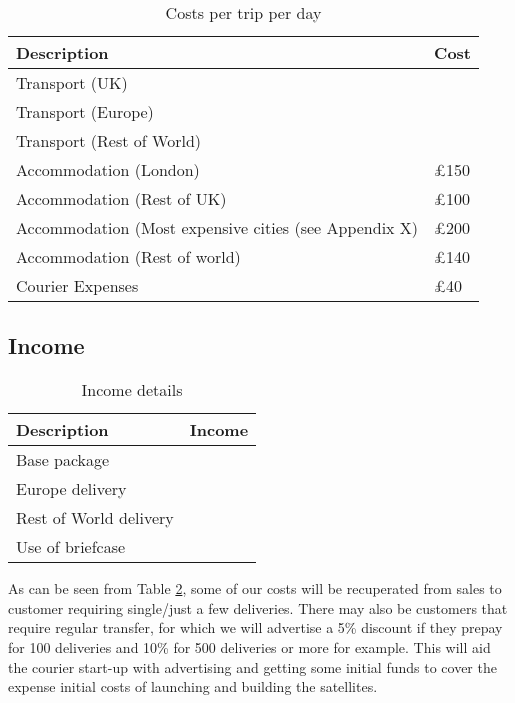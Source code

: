 \begin{table}[H]
    \centering
    \begin{tabular}{|p{}|p{}|}
        \hline
        \textbf{Description} & \textbf{Cost} \\
        \hline
        Transport (UK) & \\
        \hline
        Transport (Europe) & \\
        \hline
        Transport (Rest of World) & \\
        \hline
        Accommodation (London) & £150\\
        \hline
        Accommodation (Rest of UK) & £100\\
        \hline
        Accommodation (Most expensive cities (see Appendix X) & £200\\
        \hline
        Accommodation (Rest of world) & £140\\
        \hline
        Courier Expenses & £40\\
        \hline
    \end{tabular}
    \caption{Costs per trip per day}
    \label{tab:tripCosts}
\end{table}

\subsection{Income}

\begin{table}[H]
    \centering
    \begin{tabular}{|p{}|p{}|}
        \hline
        \textbf{Description} & \textbf{Income} \\
        \hline
        Base package & \\
        \hline
        Europe delivery & \\
        \hline
        Rest of World delivery & \\
        \hline
        Use of briefcase & \\
        \hline
    \end{tabular}
    \caption{Income details}
    \label{tab:customerPricing}
\end{table}

As can be seen from Table \ref{tab:customerPricing}, some of our costs will be recuperated from sales to customer requiring single/just a few deliveries. There may also be customers that require regular transfer, for which we will advertise a 5\% discount if they prepay for 100 deliveries and 10\% for 500 deliveries or more for example. This will aid the courier start-up with advertising and getting some initial funds to cover the expense initial costs of launching and building the satellites.

